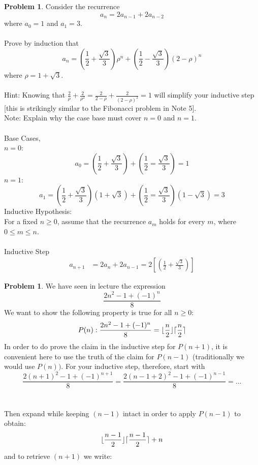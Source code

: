 \documentclass[10pt,leqno ]{article}
\theoremstyle{definition}
\newtheorem{problem}[theorem]{Problem}
\DeclarePairedDelimiter{\ceil}{\lceil}{\rceil}
\DeclarePairedDelimiter{\floor}{\lfloor}{\rfloor}
\begin{document}
\begin{problem} 
Consider the recurrence
$$a_n = 2a_{n-1}+ 2a_{n-2}$$
where $a_0= 1$ and $a_1= 3$.
\\\\
Prove by induction that
$$a_n = \left(\frac{1}{2}+\frac{\sqrt{3}}{3} \right) \rho^n + \left( \frac{1}{2}-\frac{\sqrt{3}}{3} \right) \left(2- \rho \right)^n$$
where $\rho = 1 + \sqrt{3}$.
\\\\
Hint:  Knowing that $\frac{2}{\rho}+\frac{2}{\rho^2}= \frac{2}{2 - \rho}+\frac{2}{(2 - \rho)^2} = 1$ will simplify your inductive step [this is  strikingly similar to the Fibonacci problem in Note 5].
\\
Note:  Explain why the case base must cover $n= 0$ and $n= 1$.
\Large
\\\\
Base Cases,\\
$n = 0$:
$$a_0 = \left( \frac{1}{2} + \frac{\sqrt{3}}{3} \right) + \left( \frac{1}{2} = \frac{\sqrt{3}}{3} \right) = 1$$
$n = 1$:
$$a_1 = \left( \frac{1}{2} + \frac{\sqrt{3}}{3} \right) (1 + \sqrt{3}) + \left( \frac{1}{2} = \frac{\sqrt{3}}{3} \right) (1 - \sqrt{3}) = 3$$
Inductive Hypothesis:\\
For a fixed $n \geq 0$, assume that the recurrence $a_m$ holds for every $m$, where $0 \leq m \leq n$.\\\\
Inductive Step
\begin{align*}
a_{n+1} &= 2a_n + 2a_{n-1} = 2 \left[ \left( \frac{1}{2} + \frac{\sqrt{3}}{3}\right)\right]
\end{align*}
\end{problem}
\newpage

\begin{problem} We have seen in lecture the expression
$$\frac{2n^2 - 1 +(-1)^n}{8}$$
We want to show the following property is true for all $n \geq 0$:
$$P(n): \frac{2n^2 - 1 + (-1)^n}{8} = \floor{\frac{n}{2}} \ceil{\frac{n}{2}}$$
In order to do prove the claim in the inductive step for $P(n+ 1)$, it is convenient here to use the truth of the claim for $P(n-1)$ (traditionally we would use $P(n))$.  For your inductive step, therefore, start with
$$\frac{2(n+1)^2 - 1 + (-1)^{n+1}}{8} = \frac{2(n-1+2)^2 - 1 + (-1)^{n-1}}{8} = \dots$$
\\\\
Then expand while keeping $(n-1)$ intact in order to apply $P(n-1)$ to obtain:
$$\floor{\frac{n-1}{2}} \ceil{\frac{n-1}{2}}+n$$
and to retrieve $(n+ 1)$ we write:
\Large
\end{problem}
\end{document}
